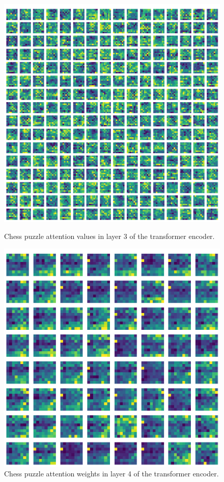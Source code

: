 \begin{figure}[H]
  \begin{minipage}{0.475\textwidth}
    \centering
    \includegraphics[width=\textwidth]{project/img/attention_maps/attention_3.png}
    \caption{Chess puzzle attention values in layer 3 of the transformer encoder.}
    \label{atnZ}
  \end{minipage}
  \hspace{0.05\textwidth}
  \begin{minipage}{0.475\textwidth}
    \centering
    \includegraphics[width=\textwidth]{project/img/attention_maps/weights_4.png}
    \caption{Chess puzzle attention weights in layer 4 of the transformer encoder.}
    \label{atnZ1}
  \end{minipage}
\end{figure}


